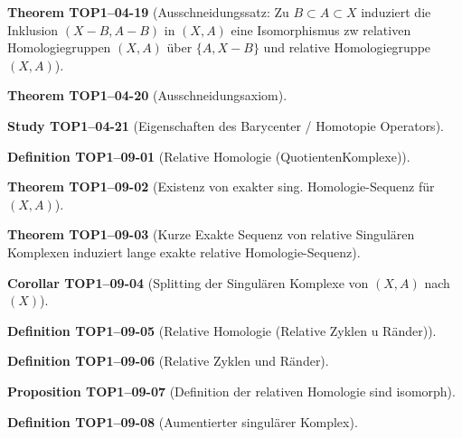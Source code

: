 \documentclass[10pt, letterpaper]{article}
\newcommand{\CustomHeading}[3]{%
  \par\medskip\noindent%
  \textbf{#1 #2} \textnormal{(#3)}.\enskip%
}
\newenvironment{DEF}[2]{\CustomHeading{Definition}{#1}{#2}}{}
\newenvironment{PROP}[2]{\CustomHeading{Proposition}{#1}{#2}}{}
\newenvironment{THEO}[2]{\CustomHeading{Theorem}{#1}{#2}}{}
\newenvironment{KORO}[2]{\CustomHeading{Corollar}{#1}{#2}}{}
\newenvironment{STUD}[2]{\CustomHeading{Study}{#1}{#2}}{}
\begin{document}
\begin{THEO}{TOP1--04-19}{Ausschneidungssatz: Zu $B\subset A\subset X$ induziert die Inklusion $(X-B,A-B)$ in $(X,A)$ eine Isomorphismus zw relativen Homologiegruppen $(X,A)$ über $\{A,X-B\}$ und relative Homologiegruppe $(X,A)$}
\end{THEO}

\begin{THEO}{TOP1--04-20}{Ausschneidungsaxiom}
\end{THEO}

\begin{STUD}{TOP1--04-21}{Eigenschaften des Barycenter / Homotopie Operators}
\end{STUD}

\begin{DEF}{TOP1--09-01}{Relative Homologie (QuotientenKomplexe)}
\end{DEF}

\begin{THEO}{TOP1--09-02}{Existenz von exakter sing. Homologie-Sequenz für $(X,A)$}
\end{THEO}

\begin{THEO}{TOP1--09-03}{Kurze Exakte Sequenz von relative Singulären Komplexen induziert lange exakte relative Homologie-Sequenz}
\end{THEO}

\begin{KORO}{TOP1--09-04}{Splitting der Singulären Komplexe von $(X,A)$ nach $(X)$}
\end{KORO}

\begin{DEF}{TOP1--09-05}{Relative Homologie (Relative Zyklen u Ränder)}
\end{DEF}

\begin{DEF}{TOP1--09-06}{Relative Zyklen und Ränder}
\end{DEF}

\begin{PROP}{TOP1--09-07}{Definition der relativen Homologie sind isomorph}
\end{PROP}

\begin{DEF}{TOP1--09-08}{Aumentierter singulärer Komplex}
\end{DEF}
\end{document}
